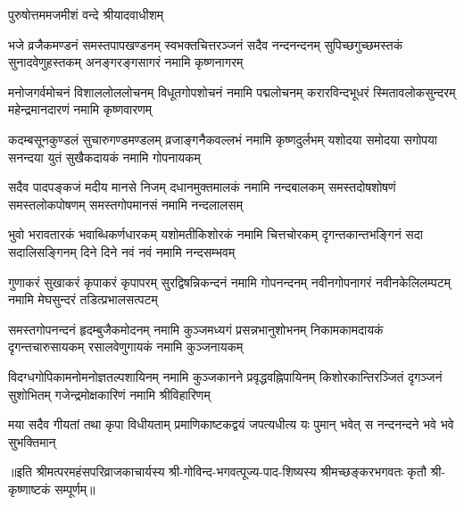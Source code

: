 
{पुरुषोत्तममजमीशं वन्दे श्रीयादवाधीशम्}

\fourlineindentedshloka
{भजे व्रजैकमण्डनं समस्तपापखण्डनम्}
{स्वभक्तचित्तरञ्जनं सदैव नन्दनन्दनम्}
{सुपिच्छगुच्छमस्तकं सुनादवेणुहस्तकम्}
{अनङ्गरङ्गसागरं नमामि कृष्णनागरम्}

\fourlineindentedshloka
{मनोजगर्वमोचनं विशाललोललोचनम्}
{विधूतगोपशोचनं नमामि पद्मलोचनम्}
{करारविन्दभूधरं स्मितावलोकसुन्दरम्}
{महेन्द्रमानदारणं नमामि कृष्णवारणम्}

\fourlineindentedshloka
{कदम्बसूनकुण्डलं सुचारुगण्डमण्डलम्}
{व्रजाङ्गनैकवल्लभं नमामि कृष्णदुर्लभम्}
{यशोदया समोदया सगोपया सनन्दया}
{युतं सुखैकदायकं नमामि गोपनायकम्}

\fourlineindentedshloka
{सदैव पादपङ्कजं मदीय मानसे निजम्}
{दधानमुक्तमालकं नमामि नन्दबालकम्}
{समस्तदोषशोषणं समस्तलोकपोषणम्}
{समस्तगोपमानसं नमामि नन्दलालसम्}

\fourlineindentedshloka
{भुवो भरावतारकं भवाब्धिकर्णधारकम्}
{यशोमतीकिशोरकं नमामि चित्तचोरकम्}
{दृगन्तकान्तभङ्गिनं सदा सदालिसङ्गिनम्}
{दिने दिने नवं नवं नमामि नन्दसम्भवम्}

\fourlineindentedshloka
{गुणाकरं सुखाकरं कृपाकरं कृपापरम्}
{सुरद्विषन्निकन्दनं नमामि गोपनन्दनम्}
{नवीनगोपनागरं नवीनकेलिलम्पटम्}
{नमामि मेघसुन्दरं तडित्प्रभालसत्पटम्}

\fourlineindentedshloka
{समस्तगोपनन्दनं हृदम्बुजैकमोदनम्}
{नमामि कुञ्जमध्यगं प्रसन्नभानुशोभनम्}
{निकामकामदायकं दृगन्तचारुसायकम्}
{रसालवेणुगायकं नमामि कुञ्जनायकम्}

\fourlineindentedshloka
{विदग्धगोपिकामनोमनोज्ञतल्पशायिनम्}
{नमामि कुञ्जकानने प्रवृद्धवह्निपायिनम्}
{किशोरकान्तिरञ्जितं दृगञ्जनं सुशोभितम्}
{गजेन्द्रमोक्षकारिणं नमामि श्रीविहारिणम्}

{मया सदैव गीयतां तथा कृपा विधीयताम्}
{प्रमाणिकाष्टकद्वयं जपत्यधीत्य यः पुमान्}
{भवेत् स नन्दनन्दने भवे भवे सुभक्तिमान्}

॥इति श्रीमत्परमहंसपरिव्राजकाचार्यस्य श्री-गोविन्द-भगवत्पूज्य-पाद-शिष्यस्य 
श्रीमच्छङ्करभगवतः कृतौ श्री-कृष्णाष्टकं सम्पूर्णम्॥
